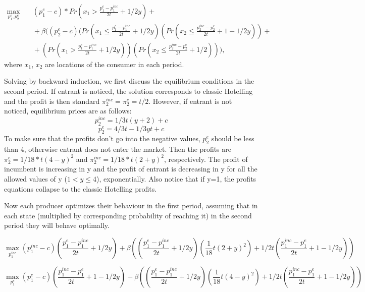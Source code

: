 \documentclass{article}
\begin{document}
    $$ \begin{aligned}
    \max_{p^{e}_1, p^{e}_2} {}
    & \quad (p^{e}_1-c)* Pr(x_1 > \frac{p^{e}_1-p^{inc}_1}{2t} + 1/2y) + \\
    & \quad + \beta((p^{e}_2-c)(Pr(x_1 \leq \frac{p^{e}_1-p^{inc}_1}{2t} + 1/2y)(Pr(x_2 \leq \frac{p^{inc}_2-p^{e}_2}{2t} + 1 - 1/2y)) + \\
    & \quad + (Pr(x_1 > \frac{p^{e}_1-p^{inc}_1}{2t} + 1/2y))(Pr(x_2 \leq \frac{p^{inc}_2-p^{e}_2}{2t} + 1/2))),
    \end{aligned}
    $$
where $x_1$, $x_2$ are locations of the consumer in each period. 

    
Solving by backward induction, we first discuss the equilibrium conditions in the second period. 
If entrant is noticed, the solution corresponds to classic Hotelling and the profit is then standard $\pi_{2}^{inc} = \pi_{2}^{e}= t/2$. However, if entrant is not noticed, equilibrium prices are as follows:
$$
p^{inc}_2 =1/3t(y+ 2) + c $$
$$ p^{e}_2 =4/3t - 1/3yt + c$$
To make sure that the profits don't go into the negative values, $ p^{e}_2$ should be less than 4, otherwise entrant does not enter the market. Then the profits are $\pi_{2}^{e} = 1/18*t(4-y)^2$ and $\pi_{2}^{inc}=1/18*t(2+y)^2$, respectively. The profit of incumbent is increasing in y and the profit of entrant is decreasing in y for all the allowed values of y ($1<y\leq4$), exponentially. Also notice that if y=1, the profits equations collapse to the classic Hotelling profits. 

Now each producer optimizes their behaviour in the first period, assuming that in each state (multiplied by corresponding probability of reaching it) in the second period they will behave optimally. 

	


 $$
    \max_{p^{inc}_1} {}
   (p^{inc}_1-c)(\frac{p^{e}_1-p^{inc}_1}{2t} + 1/2y) 
    + \beta((\frac{p^{e}_1-p^{inc}_1}{2t} + 1/2y)(\frac{1}{18}t(2+y)^2) + 
    1/2t(\frac{p^{inc}_1-p^{e}_1}{2t} + 1 - 1/2y))
    $$
    
    $$
   \max_{p^{e}_1} {}
   (p^{e}_1-c)(\frac{p^{inc}_1-p^{e}_1}{2t} + 1 -1/2y) 
    + \beta((\frac{p^{e}_1-p^{inc}_1}{2t} + 1/2y)(\frac{1}{18}t(4-y)^2) + 
    1/2t(\frac{p^{inc}_1-p^{e}_1}{2t} + 1 - 1/2y))
    $$
\end{document}
